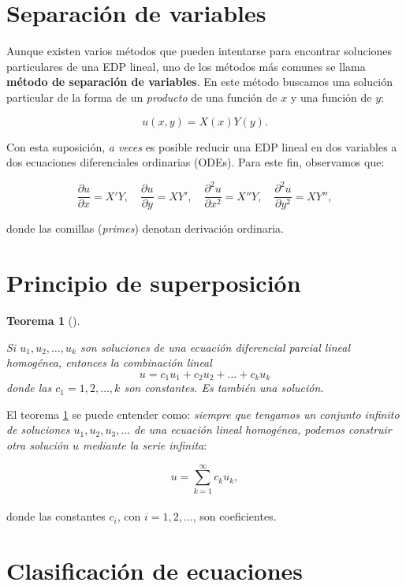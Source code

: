 \documentclass[
  spanish,
  us-letterpaper,
  DIV=11,
  numbers=noendperiod]{scrreprt}
\theoremstyle{plain}
\newtheorem{theorem}{Teorema}[chapter]
\theoremstyle{definition}
\theoremstyle{remark}
\begin{document}
\section{Separación de variables}\label{separaciuxf3n-de-variables}

Aunque existen varios métodos que pueden intentarse para encontrar
soluciones particulares de una EDP lineal, uno de los métodos más
comunes se llama \textbf{método de separación de variables}. En este
método buscamos una solución particular de la forma de un
\emph{producto} de una función de \(x\) y una función de \(y\):

\[
u(x, y) = X(x)Y(y).
\]

Con esta suposición, \emph{a veces} es posible reducir una EDP lineal en
dos variables a dos ecuaciones diferenciales ordinarias (ODEs). Para
este fin, observamos que:

\[
\dfrac{\partial u}{\partial x} = X'Y, \quad
\dfrac{\partial u}{\partial y} = XY', \quad
\dfrac{\partial^2 u}{\partial x^2} = X''Y, \quad
\dfrac{\partial^2 u}{\partial y^2} = XY'',
\]

donde las comillas (\emph{primes}) denotan derivación ordinaria.

\section{Principio de
superposición}\label{principio-de-superposiciuxf3n}

\begin{theorem}[]\protect\hypertarget{thm-superposition}{}\label{thm-superposition}

Si \(u_1 , u_2 , \dots , u_k\) son soluciones de una ecuación
diferencial parcial lineal homogénea, entonces la combinación lineal \[
u = c_1u_1 + c_2u_2 + \dots + c_ku_k
\] donde las \(c_1=1,2,\dots,k\) son constantes. Es también una
solución.

\end{theorem}

El teorema \ref{thm-superposition} se puede entender como: \emph{siempre
que tengamos un conjunto infinito de soluciones
\(u_1, u_2, u_3, \ldots\) de una ecuación lineal homogénea, podemos
construir otra solución \(u\) mediante la serie infinita}:

\[  
u = \sum_{k=1}^{\infty} c_k u_k,  
\]\\
donde las constantes \(c_i\), con \(i = 1, 2, \ldots\), son
coeficientes.

\section{Clasificación de
ecuaciones}\label{clasificaciuxf3n-de-ecuaciones}
\end{document}
